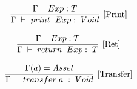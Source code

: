 \documentclass[12pt,twoside,openright,a4paper]{report}
\begin{document}
\begin{itemize}
    \begin{align*}
    \infer[\mathrm{[Print]}]
    {\Gamma \hspace{0.1cm} \vdash  \hspace{0.1cm}print\hspace{0.1cm} \hspace{0.1cm}Exp: \hspace{0.1cm}Void } 
    {  \Gamma \vdash Exp: T  }
    \end{align*}
    
    \begin{align*}
    \infer[\mathrm{[Ret]}]
    {\Gamma \hspace{0.1cm} \vdash  \hspace{0.1cm}return\hspace{0.1cm} \hspace{0.1cm}Exp: \hspace{0.1cm}T } 
    {  \Gamma \vdash Exp: T  }
    \end{align*}
    
    \begin{align*}
    \infer[\mathrm{[Transfer]}]
    {\Gamma \hspace{0.1cm} \vdash  transfer\hspace{0.1cm} a \hspace{0.1cm}: \hspace{0.1cm}Void } 
    {  \Gamma(a) = Asset  }
    \end{align*}

\end{itemize}
\end{document}
